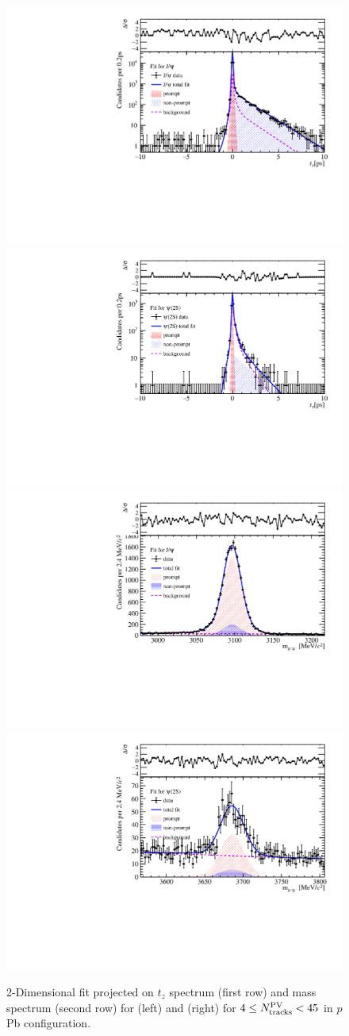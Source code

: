 \begin{figure}[!tbp]
\begin{center}
\includegraphics[width=0.49\linewidth]{pdf/pPb/Workdir/TwoDimFit/ProjTz/Jpsi_n1y1pt1.pdf}
\includegraphics[width=0.49\linewidth]{pdf/pPb/Workdir/TwoDimFit/ProjTz/Psi2S_n1y1pt1.pdf}
\includegraphics[width=0.49\linewidth]{pdf/pPb/Workdir/TwoDimFit/ProjMass/Jpsi_n1y1pt1.pdf}
\includegraphics[width=0.49\linewidth]{pdf/pPb/Workdir/TwoDimFit/ProjMass/Psi2S_n1y1pt1.pdf}
\end{center}
\caption{
	2-Dimensional fit projected on $t_z$ spectrum (first row)  and mass spectrum (second row) for \jpsi (left) and \psitwos (right) for $4\leq N_{\rm tracks}^{\rm PV} < 45$ in $p$Pb configuration.}
\label{fig_2DFit}
\end{figure}
